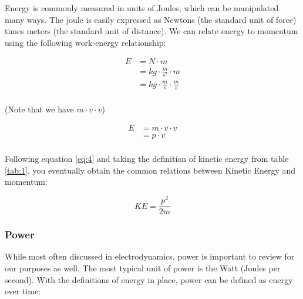 \documentclass{article}
\begin{document}
                Energy is commonly measured in units of Joules, which can be manipulated many ways. The joule is easily expressed as Newtons (the standard unit of force) times meters (the standard unit of distance). 
                We can relate energy to momentum using the following work-energy relationship:
                
                \begin{equation}\label{eq:3}
                    \begin{split}
                    E & = N \cdot m \\
                    & = kg \cdot \frac{m}{s^2} \cdot m \\
                    & = kg \cdot \frac{m}{s} \cdot \frac{m}{s}\\
                    \end{split}
                \end{equation}
                \begin{center}
                    (Note that we have $m \cdot v \cdot v$)
                \end{center}
                \begin{equation}\label{eq:4}
                    \begin{split}
                    E & = \boxed{m \cdot v} \cdot v \\
                    & = p \cdot v \\
                    \end{split}
                \end{equation}

                Following equation \ref{eq:4} and taking the definition of kinetic energy from table \ref{tab:1}, you eventually obtain the common relations between Kinetic Energy and momentum:

                \begin{equation}\label{eq:5}
                    KE = \frac{p^2}{2m}
                \end{equation}
        
            \subsubsection{Power}
                While most often discussed in electrodynamics, power is important to review for our purposes as well. The most typical unit of power is the Watt (Joules per second).
                With the definitions of energy in place, power can be defined as energy over time:
\end{document}
